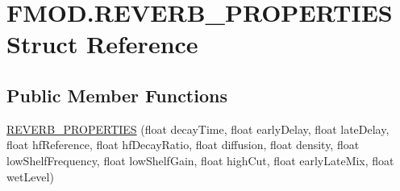 \hypertarget{struct_f_m_o_d_1_1_r_e_v_e_r_b___p_r_o_p_e_r_t_i_e_s}{}\section{F\+M\+O\+D.\+R\+E\+V\+E\+R\+B\+\_\+\+P\+R\+O\+P\+E\+R\+T\+I\+ES Struct Reference}
\label{struct_f_m_o_d_1_1_r_e_v_e_r_b___p_r_o_p_e_r_t_i_e_s}
\subsection*{Public Member Functions}
\begin{DoxyCompactItemize}
\item 
\hyperlink{struct_f_m_o_d_1_1_r_e_v_e_r_b___p_r_o_p_e_r_t_i_e_s_a129b0f17b891f390e6ced3e48001c942}{R\+E\+V\+E\+R\+B\+\_\+\+P\+R\+O\+P\+E\+R\+T\+I\+ES} (float decay\+Time, float early\+Delay, float late\+Delay, float hf\+Reference, float hf\+Decay\+Ratio, float diffusion, float density, float low\+Shelf\+Frequency, float low\+Shelf\+Gain, float high\+Cut, float early\+Late\+Mix, float wet\+Level)
\end{DoxyCompactItemize}

